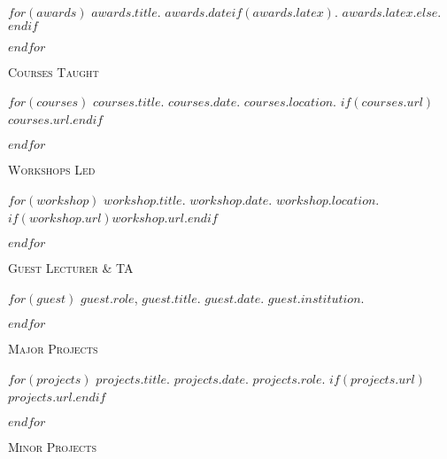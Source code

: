 \documentclass[11pt,article,oneside]{memoir}
\begin{document}
\medskip

\medskip
{}

$for(awards)$
\ind $awards.title$. \emph{$awards.date$}$if(awards.latex)$. $awards.latex$.$else${.}$endif$
\smallskip

\pagebreak[1]
$endfor$

\medskip

\medskip
{}

\ind \textsc{Courses Taught}

\medskip

$for(courses)$
\ind $courses.title$. \emph{$courses.date$}. $courses.location$. $if(courses.url)$\href{$courses.url$}{$courses.url$}.$endif$

\smallskip

\pagebreak[1]
$endfor$
\bigskip

\ind \textsc{Workshops Led}

\medskip

$for(workshop)$
\ind $workshop.title$. \emph{$workshop.date$}. $workshop.location$. $if(workshop.url)$\href{$workshop.url$}{$workshop.url$}.$endif$

\smallskip

\pagebreak[1]
$endfor$
\bigskip

\ind \textsc{Guest Lecturer \& TA}

\medskip

$for(guest)$
\ind $guest.role$, $guest.title$. \emph{$guest.date$}. $guest.institution$.

\smallskip

\pagebreak[1]
$endfor$

\medskip

\medskip
{}

\ind \textsc{Major Projects}

\medskip

$for(projects)$
\ind \emph{$projects.title$}. \emph{$projects.date$}. $projects.role$. $if(projects.url)$\href{$projects.url$}{$projects.url$}.$endif$

\smallskip
$endfor$

\bigskip 

\ind \textsc{Minor Projects}

\medskip
\end{document}
